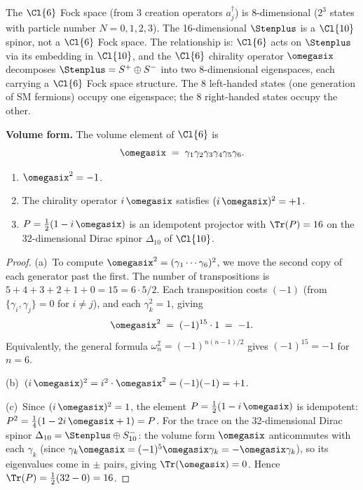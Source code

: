\begin{remark}
The $\Cl{6}$ Fock space (from 3 creation operators $a_j^\dagger$)
is 8-dimensional ($2^3$ states with particle number $N = 0,1,2,3$).
The 16-dimensional $\Stenplus$ is a $\Cl{10}$ spinor, not a $\Cl{6}$
Fock space.  The relationship is: $\Cl{6}$ acts on $\Stenplus$ via
its embedding in $\Cl{10}$, and the $\Cl{6}$ chirality operator
$\omegasix$ decomposes $\Stenplus = S^+ \oplus S^-$ into two
8-dimensional eigenspaces, each carrying a $\Cl{6}$ Fock space
structure.  The 8 left-handed states (one generation of SM fermions)
occupy one eigenspace; the 8 right-handed states occupy the other.
\end{remark}

\medskip
\noindent\textbf{Volume form.}
The volume element of $\Cl{6}$ is
\begin{equation}\label{eq:omega6}
  \omegasix \;=\; \gamma_1\gamma_2\gamma_3\gamma_4\gamma_5\gamma_6.
\end{equation}

\begin{proposition}\label{prop:omega6}
\begin{enumerate}
  \item[\textup{(a)}] $\omegasix^2 = -1$.
  \item[\textup{(b)}] The chirality operator $i\,\omegasix$ satisfies
    $(i\,\omegasix)^2 = +1$.
  \item[\textup{(c)}] $P = \tfrac{1}{2}(1 - i\,\omegasix)$ is an
    idempotent projector with $\Tr(P) = 16$ on the 32-dimensional
    Dirac spinor $\Delta_{10}$ of $\Cl{10}$.
\end{enumerate}
\end{proposition}

\begin{proof}
(a)~To compute $\omegasix^2 = (\gamma_1\cdots\gamma_6)^2$, we
move the second copy of each generator past the first.
The number of transpositions is $5+4+3+2+1+0 = 15 = 6\cdot 5/2$.
Each transposition costs $(-1)$ (from $\{\gamma_i,\gamma_j\}=0$
for $i\ne j$), and each $\gamma_k^2 = 1$, giving
\begin{equation}\label{eq:omega6-sq}
  \omegasix^2
  \;=\; (-1)^{15}\cdot 1
  \;=\; -1.
\end{equation}
Equivalently, the general formula $\omega_n^2 = (-1)^{n(n-1)/2}$
gives $(-1)^{15} = -1$ for $n=6$.

(b)~$(i\,\omegasix)^2 = i^2\cdot\omegasix^2 = (-1)(-1) = +1$.

(c)~Since $(i\,\omegasix)^2 = 1$, the element
$P = \tfrac{1}{2}(1-i\,\omegasix)$ is idempotent:
$P^2 = \tfrac{1}{4}(1-2i\,\omegasix + 1) = P$.
For the trace on the 32-dimensional Dirac spinor
$\Delta_{10} = \Stenplus\oplus S_{10}^-$:
the volume form $\omegasix$ anticommutes with each $\gamma_k$
(since $\gamma_k\omegasix = (-1)^5\omegasix\gamma_k = -\omegasix\gamma_k$),
so its eigenvalues come in $\pm$ pairs, giving $\Tr(\omegasix)=0$.
Hence $\Tr(P) = \tfrac{1}{2}(32 - 0) = 16$.
\end{proof}

